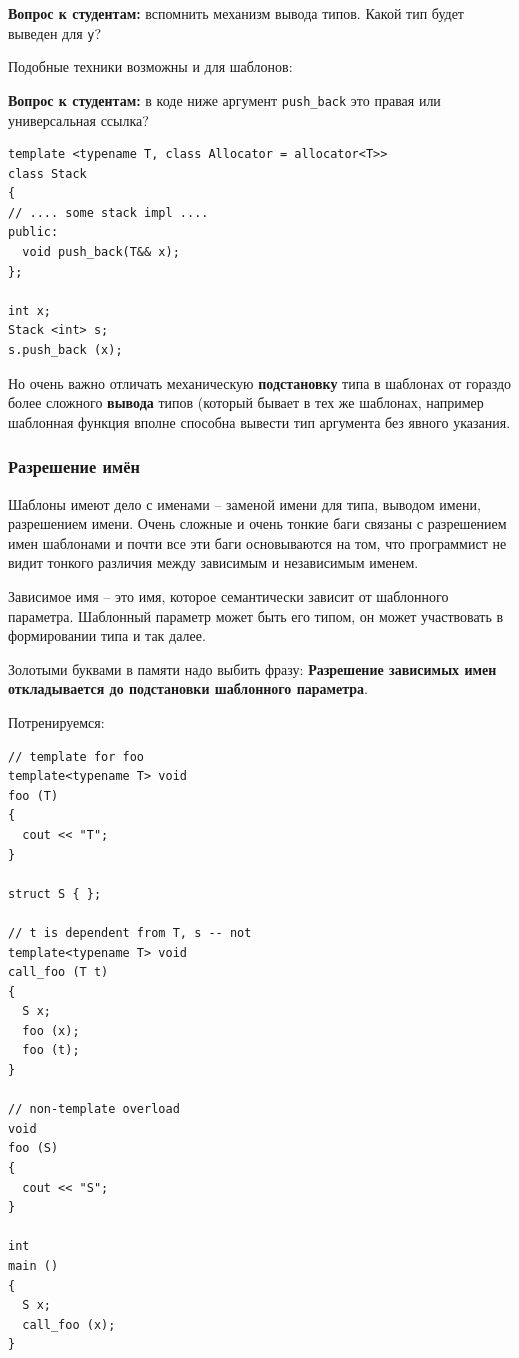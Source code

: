 \documentclass[a4paper,12pt,oneside]{article}
\newif\ifanswers
\begin{document}
\textbf{Вопрос к студентам:} вспомнить механизм вывода типов. Какой тип будет выведен для \lstinline!y!?

\ifanswers
Правильный ответ -- \lstinline!int&! так как для \lstinline!x! будет выведен тип \lstinline!int&!, а потом сработает свертывание ссылок.
\fi

Подобные техники возможны и для шаблонов:

\textbf{Вопрос к студентам:} в коде ниже аргумент \lstinline!push_back! это правая или универсальная ссылка?

\begin{lstlisting}
template <typename T, class Allocator = allocator<T>>
class Stack
{
// .... some stack impl .... 
public:
  void push_back(T&& x);
};

int x;
Stack <int> s;
s.push_back (x);
\end{lstlisting}

\ifanswers
Правильный ответ -- правая, так как вывод \lstinline!T! для вектора подставляется, а не выводится. Таким образом будет ошибка компиляции.
\fi

Но очень важно отличать механическую \textbf{подстановку} типа в шаблонах от гораздо более сложного \textbf{вывода} типов (который бывает в тех же шаблонах, например шаблонная функция вполне способна вывести тип аргумента без явного указания.

\subsubsection{Разрешение имён}

Шаблоны имеют дело с именами -- заменой имени для типа, выводом имени, разрешением имени. Очень сложные и очень тонкие баги связаны с разрешением имен шаблонами и почти все эти баги основываются на том, что программист не видит тонкого различия между зависимым и независимым именем.

Зависимое имя -- это имя, которое семантически зависит от шаблонного параметра. Шаблонный параметр может быть его типом, он может участвовать в формировании типа и так далее.

Золотыми буквами в памяти надо выбить фразу: \textbf{Разрешение зависимых имен откладывается до подстановки шаблонного параметра}.

Потренируемся:

\begin{lstlisting}
// template for foo
template<typename T> void 
foo (T) 
{ 
  cout << "T"; 
}

struct S { };

// t is dependent from T, s -- not
template<typename T> void 
call_foo (T t) 
{
  S x;
  foo (x);
  foo (t); 
}

// non-template overload
void 
foo (S) 
{   
  cout << "S"; 
}

int 
main () 
{
  S x; 
  call_foo (x); 
}
\end{lstlisting}
\end{document}
